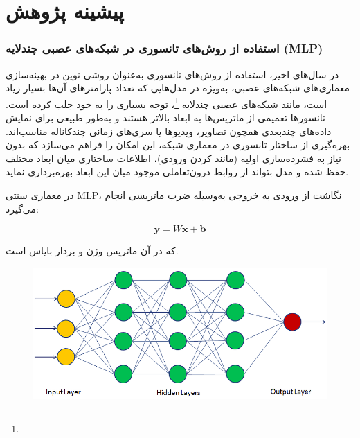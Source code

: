 \chapter{پیشینه پژوهش}



\subsection*{استفاده از روش‌های تانسوری در شبکه‌های عصبی چندلایه (MLP)}

در سال‌های اخیر، استفاده از روش‌های تانسوری به‌عنوان روشی نوین در بهینه‌سازی معماری‌های شبکه‌های عصبی، به‌ویژه در مدل‌هایی که تعداد پارامترهای آن‌ها بسیار زیاد است، مانند شبکه‌های عصبی چندلایه \footnote{}، توجه بسیاری را به خود جلب کرده است. تانسورها تعمیمی از ماتریس‌ها به ابعاد بالاتر هستند و به‌طور طبیعی برای نمایش داده‌های چندبعدی همچون تصاویر، ویدیوها یا سری‌های زمانی چندکاناله مناسب‌اند. بهره‌گیری از ساختار تانسوری در معماری شبکه، این امکان را فراهم می‌سازد که بدون نیاز به فشرده‌سازی اولیه (مانند  کردن ورودی)، اطلاعات ساختاری میان ابعاد مختلف حفظ شده و مدل بتواند از روابط درون‌تعاملی موجود میان این ابعاد بهره‌برداری نماید.

در معماری سنتی MLP، نگاشت از ورودی  به خروجی  به‌وسیله ضرب ماتریسی انجام می‌گیرد:

\[
\mathbf{y} = W\mathbf{x} + \mathbf{b}
\]

که در آن  ماتریس وزن و  بردار بایاس است. 




\begin{figure}[h]
	\centering
	\begin{minipage}[b]{0.8\textwidth}
		\centering
		\includegraphics[width=\textwidth]{transformer_images/mlp.png}
		\caption{}
		\label{fig:Mlp}
	\end{minipage}
	\hfill
\end{figure}





